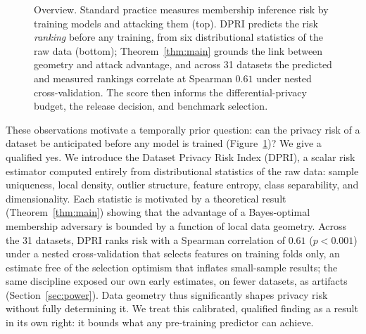 \begin{figure}[t]
{%
}
\caption{Overview. Standard practice measures membership inference risk
         by training models and attacking them (top). DPRI predicts the
         risk \emph{ranking} before any training, from six
         distributional statistics of the raw data (bottom);
         Theorem~\ref{thm:main} grounds the link between geometry and
         attack advantage, and across 31 datasets the predicted and
         measured rankings correlate at Spearman $0.61$ under nested
         cross-validation. The score then informs the
         differential-privacy budget, the release decision, and
         benchmark selection.}
\label{fig:overview}
\end{figure}

These observations motivate a temporally prior question: can the privacy
risk of a dataset be anticipated before any model is trained
(Figure~\ref{fig:overview})? We give a qualified yes. We introduce the Dataset Privacy Risk Index (DPRI), a
scalar risk estimator computed entirely from distributional statistics
of the raw data: sample uniqueness, local density, outlier structure,
feature entropy, class separability, and dimensionality. Each statistic
is motivated by a theoretical result (Theorem~\ref{thm:main}) showing
that the advantage of a Bayes-optimal membership adversary is bounded by
a function of local data geometry. Across the 31 datasets, DPRI ranks
risk with a Spearman correlation of $0.61$ ($p<0.001$) under a nested
cross-validation that selects features on training folds only, an
estimate free of the selection optimism that inflates small-sample
results; the same discipline exposed our own early estimates, on fewer
datasets, as artifacts (Section~\ref{sec:power}). Data geometry thus
significantly shapes privacy risk without fully determining it. We treat
this calibrated, qualified finding as a result in its own right: it
bounds what any pre-training predictor can achieve.

